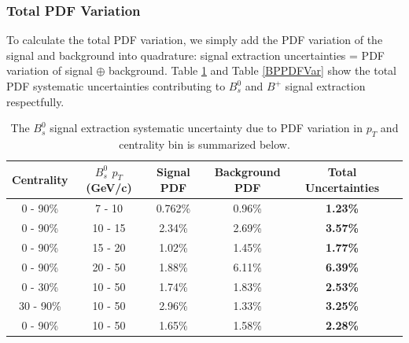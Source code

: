\subsubsection{Total PDF Variation}

To calculate the total PDF variation, we simply add the PDF variation of the signal and background into quadrature: signal extraction uncertainties = PDF variation of signal $\oplus$ background. Table \ref{BsPDFVar} and Table \ref{BPPDFVar} show the total PDF systematic uncertainties contributing to $B^0_s$ and $B^+$ signal extraction respectfully. 



\begin{table}[h]
\begin{center}
\caption{The $B^0_s$ signal extraction systematic uncertainty due to PDF variation in $p_T$ and centrality bin is summarized below.}
\vspace{1em}
\label{BsPDFVar}
  \begin{tabular}{| c | c |c | c| c| c| }
    \hline
     Centrality & $B^0_s$ $p_T$ (GeV/c) & Signal PDF & Background PDF  &  Total Uncertainties \\
    \hline
    \hline
0 - 90\% & 7 - 10 &   0.762\%  &  0.96\% & \textbf{1.23\%} \\ 
0 - 90\% & 10 - 15 & 2.34\%  & 2.69\%  & \textbf{3.57\%} \\ 
0 - 90\% & 15 - 20 &  1.02\% & 1.45\%   &  \textbf{1.77\%} \\ 
0 - 90\% & 20 - 50 &  1.88\%    & 6.11\%  &  \textbf{6.39\%} \\ 
0 - 30\% & 10 - 50  & 1.74\%  & 1.83\%  & \textbf{2.53\%}  \\ 
30 - 90\% & 10 - 50 &  2.96\% &   1.33\%  & \textbf{3.25\%} \\ 
0 - 90\% & 10 - 50 &  1.65\%   & 1.58\%  & \textbf{2.28\%} \\ 
    \hline
    \hline
\end{tabular}
\end{center}
\end{table}



